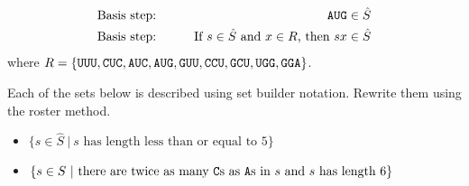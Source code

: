 \documentclass[12pt, oneside]{article}
\begin{document}
 \begin{alignat*}{2}
\text{Basis step:} & & \texttt{A}\texttt{U}\texttt{G} \in \hat{S}\\
\text{Basis step:} & \qquad& \text{If } s \in \hat{S} \text{ and } x \in R \text{, then } sx\in \hat{S}\\
 \end{alignat*}
 where $R = \{ \texttt{U}\texttt{U}\texttt{U}, \texttt{C}\texttt{U}\texttt{C}, \texttt{A}\texttt{U}\texttt{C}, \texttt{A}\texttt{U}\texttt{G}, \texttt{G}\texttt{U}\texttt{U}, \texttt{C}\texttt{C}\texttt{U}, \texttt{G}\texttt{C}\texttt{U}, \texttt{U}\texttt{G}\texttt{G}, \texttt{G}\texttt{G}\texttt{A} \}$.

Each of the sets below is described using set builder notation. Rewrite them using the roster method. 
\begin{itemize}
\item $\{s \in \hat{S} ~|~ s \text{ has length less than or equal to $5$} \}$ 

\vfill


\item $\{s \in S ~|~ \text{there are twice as many $\texttt{C}$s as $\texttt{A}$s in $s$ and $s$ has length $6$} \}$ 

\vfill

\end{itemize}
\newpage
\end{document}
